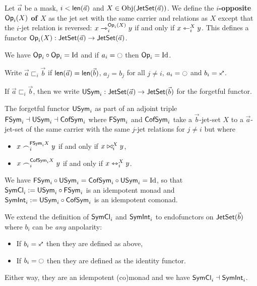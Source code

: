 \documentclass[a4paper]{article}
\begin{document}
\begin{definition} \label{def:op}
	Let $\vec a$ be a mask, $i < \mathsf{len}(\vec a)$ and $X \in \mathrm{Obj}(\mathsf{JetSet}(\vec a))$.
	We define the \textbf{$i$-opposite ${\mathsf{Op}}_i(X)$ of $X$} as the jet set with the same carrier and relations as $X$ except that the $i$-jet relation is reversed: $x \rightarrowtriangle_i^{{\mathsf{Op}}_i(X)} y$ if and only if $x \leftarrowtriangle_i^X y$.
	This defines a functor ${\mathsf{Op}}_i(X) : \mathsf{JetSet}(\vec a) \to \mathsf{JetSet}(\vec a)$.
\end{definition}
We have ${\mathsf{Op}}_i \circ {\mathsf{Op}}_i = \mathrm{Id}$ and if $a_i = \npolar$ then ${\mathsf{Op}}_i = \mathrm{Id}$.
\begin{definition} \label{def:sym-forget}
	Write $\vec a \sqsubset_i \vec b$ if $\mathsf{len}(\vec a) = \mathsf{len}(\vec b)$, $a_j = b_j$ for all $j \neq i$, $a_i = \npolar$ and $b_i = \ypolar$.
	
	If $\vec a \sqsubset_i \vec b$, then we write $\mathsf{USym}_i : \mathsf{JetSet}(\vec a) \to \mathsf{JetSet}(\vec b)$ for the forgetful functor.
\end{definition}
\begin{corollary} \label{def:sym-free} \label{def:sym-cofree}
	The forgetful functor $\mathsf{USym}_i$ as part of an adjoint triple $\mathsf{FSym}_i \dashv \mathsf{USym}_i \dashv \mathsf{CofSym}_i$ where $\mathsf{FSym}_i$ and $\mathsf{CofSym}_i$ take a $\vec b$-jet-set $X$ to a $\vec a$-jet-set of the same carrier with the same $j$-jet relations for $j \neq i$ but where
	\begin{itemize}
		\item $x \frown_i^{\mathsf{FSym}_i X} y$ if and only if $x \mathrel{\bowtie}_i^X y$,
		\item $x \frown_i^{\mathsf{CofSym}_i X} y$ if and only if $x \leftrightarrowtriangle_i^X y$.
	\end{itemize}
	We have $\mathsf{FSym}_i \circ \mathsf{USym}_i = \mathsf{CofSym}_i \circ \mathsf{USym}_i = \mathrm{Id}$, so that $\mathsf{SymCl}_i := \mathsf{USym}_i \circ \mathsf{FSym}_i$ is an idempotent monad and $\mathsf{SymInt}_i := \mathsf{USym}_i \circ \mathsf{CofSym}_i$ is an idempotent comonad.
\end{corollary}
\begin{definition} \label{def:sym-closure-of-sym}
	We extend the definition of $\mathsf{SymCl}_i$ and $\mathsf{SymInt}_i$ to endofunctors on $\mathsf{JetSet}(\vec b)$ where $b_i$ can be \emph{any} anpolarity:
	\begin{itemize}
		\item If $b_i = \ypolar$ then they are defined as above,
		\item If $b_i = \npolar$ then they are defined as the identity functor.
	\end{itemize}
	Either way, they are an idempotent (co)monad and we have $\mathsf{SymCl}_i \dashv \mathsf{SymInt}_i$.
\end{definition}
\end{document}
